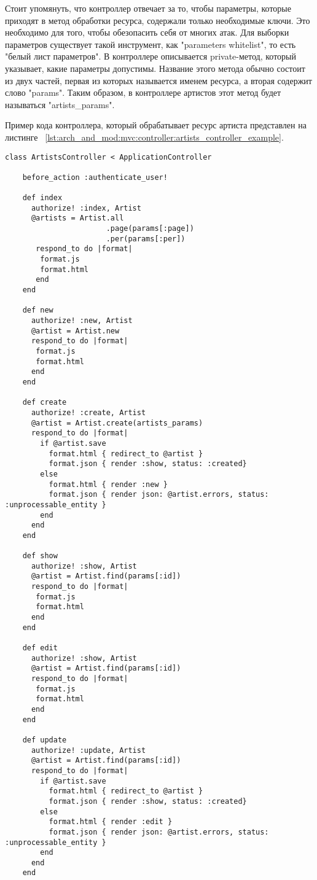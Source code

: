 Стоит упомянуть, что контроллер отвечает за то, чтобы параметры, которые приходят в метод обработки ресурса, содержали только необходимые ключи. Это необходимо для того, чтобы обезопасить себя от многих атак. Для выборки параметров существует такой инструмент, как "parameters whitelist", то есть "белый лист параметров". В контроллере описывается private-метод, который указывает, какие параметры допустимы. Название этого метода обычно состоит из двух частей, первая из которых называется именем ресурса, а вторая содержит слово "params". Таким образом, в контроллере артистов этот метод будет называться "artists\_params".

Пример кода контроллера, который обрабатывает ресурс артиста представлен на листинге ~\ref{lst:arch_and_mod:mvc:controller:artists_controller_example}.

\begin{lstlisting}[style=fsharpstyle,caption={Пример получения артистов по определенным параметрам}, label=lst:arch_and_mod:mvc:controller:artists_controller_example]
  class ArtistsController < ApplicationController

    before_action :authenticate_user!

    def index
      authorize! :index, Artist
      @artists = Artist.all
                       .page(params[:page])
                       .per(params[:per])
       respond_to do |format|
        format.js
        format.html
       end
    end

    def new
      authorize! :new, Artist
      @artist = Artist.new
      respond_to do |format|
       format.js
       format.html
      end
    end

    def create
      authorize! :create, Artist
      @artist = Artist.create(artists_params)
      respond_to do |format|
        if @artist.save
          format.html { redirect_to @artist }
          format.json { render :show, status: :created}
        else
          format.html { render :new }
          format.json { render json: @artist.errors, status: :unprocessable_entity }
        end
      end
    end

    def show
      authorize! :show, Artist
      @artist = Artist.find(params[:id])
      respond_to do |format|
       format.js
       format.html
      end
    end

    def edit
      authorize! :show, Artist
      @artist = Artist.find(params[:id])
      respond_to do |format|
       format.js
       format.html
      end
    end

    def update
      authorize! :update, Artist
      @artist = Artist.find(params[:id])
      respond_to do |format|
        if @artist.save
          format.html { redirect_to @artist }
          format.json { render :show, status: :created}
        else
          format.html { render :edit }
          format.json { render json: @artist.errors, status: :unprocessable_entity }
        end
      end
    end


\end{lstlisting}
